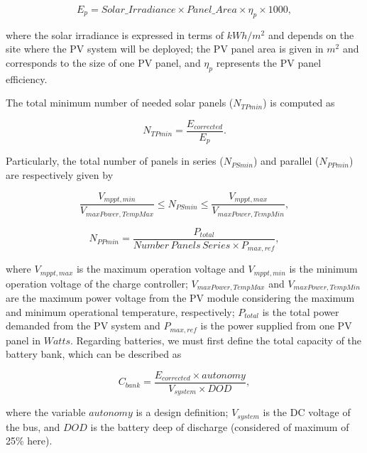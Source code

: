 \documentclass[runningheads]{llncs}
\begin{document}
\begin{equation}
\label{eq:Ep}
E_{p} = Solar\_Irradiance \times Panel\_Area \times \eta_{p} \times 1000,
\end{equation}

\noindent where the solar irradiance is expressed in terms of $kWh/m^{2}$ and depends on the site where the PV system will be deployed; 
the PV panel area is given in $m^{2}$ and corresponds to the size of one PV panel, and $\eta_{p}$ represents the PV panel efficiency.

The total minimum number of needed solar panels ($N_{TPmin}$) is computed as

\begin{equation}
\label{eq:NTPmin}
N_{TPmin} = \frac{E_{corrected}}{E_{p}}.
\end{equation}

Particularly, the total number of panels in series ($N_{PSmin}$) and parallel ($N_{PPmin}$) are respectively given by

\begin{equation}
\label{eq:NPSmin}
\frac{V_{mppt,min}}{V_{maxPower,TempMax}} \leq N_{PSmin} \leq \frac{V_{mppt,max}}{V_{maxPower,TempMin}},
\end{equation}

\begin{equation}
\label{eq:NPPmin}
N_{PPmin} = \frac{P_{total}}{Number\,Panels\,Series \times P_{max,ref}},
\end{equation}

\noindent where $V_{mppt,max}$ is the maximum operation voltage and $V_{mppt,min}$ is the minimum operation voltage of the charge controller; $V_{maxPower,TempMax}$ and $V_{maxPower,TempMin}$ are the maximum power voltage from the PV module considering the maximum and minimum operational temperature, respectively; $P_{total}$ is the total power demanded from the PV system and $P_{max,ref}$ is the power supplied from one PV panel in $Watts$.
%
Regarding batteries, we must first define the total capacity of the battery bank, which can be described as

\begin{equation}
\label{eq:Cbank}
C_{bank} = \frac{E_{corrected} \times autonomy}{V_{system} \times DOD},
\end{equation}

\noindent where the variable $autonomy$ is a design definition; %
$ V_{system} $ is the DC voltage of the bus, and $ DOD $ is the battery deep of discharge (considered of maximum of 25\% here).
\end{document}
